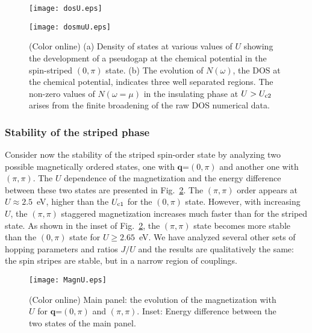 \documentclass[aps,prb,superscriptaddress,preprintnumbers,
showpacs,legalpaper,twoside,twocolumn,amsmath,amssymb]{revtex4}
\begin{document}
\begin{figure}[h]
\begin{center}
\vskip -0.5cm
\centerline{\texttt{[image: dosU.eps]}}
\vskip -0.7cm
\centerline{\texttt{[image: dosmuU.eps]}}
\vskip -0.5cm
%
\caption{(Color online) (a) Density of states at various values of
$U$ showing the development of a pseudogap at the chemical potential
in the spin-striped $(0,\pi)$ state. (b) The evolution of $N(\omega)$, the DOS at the
chemical potential, indicates three well separated regions.
The non-zero values of $N(\omega=\mu)$ in the
insulating phase at $U>U_{\rm c2}$ arises from the finite broadening of
the raw DOS numerical data.}
\vskip -0.5cm
\label{F.DOSMF}
\end{center}
\end{figure}

\subsubsection{Stability of the striped phase}

Consider now the stability of the striped
spin-order state by analyzing two possible magnetically ordered
states, one with $\mathbf{q}$=$(0,\pi)$ and another one with
$(\pi,\pi)$. The $U$
dependence of the magnetization and the energy difference
between these two states are presented in Fig.~\ref{F.MagMF2}. The
$(\pi,\pi)$ order appears at $U\approx2.5$~eV, higher than the $U_{\rm c1}$
for the $(0,\pi)$ state. However, with increasing $U$, the $(\pi,\pi)$
staggered magnetization increases much
faster than for the striped state. As shown in the inset
of Fig.~\ref{F.MagMF2}, the $(\pi,\pi)$ state becomes more stable than the
$(0,\pi)$ state for $U\geqslant2.65$~eV. We have analyzed several other sets
of hopping parameters and ratios $J/U$ and the results are qualitatively the same:
the spin stripes are stable, but in a narrow region of couplings.

\begin{figure}[h]
\begin{center}
\vskip -0.3cm
\centerline{\texttt{[image: MagnU.eps]}}
\vskip -0.4cm
%
\caption{(Color online) Main panel: the evolution of the magnetization
with $U$ for $\mathbf{q}$=$(0,\pi)$ and $(\pi,\pi)$. Inset: Energy
difference between the two states of the main panel.}
\vskip -0.5cm
\label{F.MagMF2}
\end{center}
\end{figure}
\end{document}

